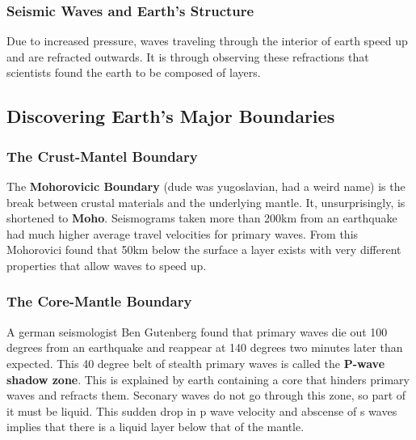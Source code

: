 \documentclass{article}
\begin{document}
\subsubsection{Seismic Waves and Earth's Structure} %
\label{ssub:seismic_waves_and_earth_s_structure}
Due to increased pressure, waves traveling through the interior of earth speed up and are refracted outwards. It is through observing these refractions that scientists found the earth to be composed of layers.

\subsection{Discovering Earth's Major Boundaries} %
\label{sub:discovering_earth_s_major_boundaries}
\subsubsection{The Crust-Mantel Boundary} %
\label{ssub:the_crust_mantel_boundary}
The \textbf{Mohorovicic Boundary} (dude was yugoslavian, had a weird name) is the break between crustal materials and the underlying mantle. It, unsurprisingly, is shortened to \textbf{Moho}. Seismograms taken more than 200km from an earthquake had much higher average travel velocities for primary waves. From this Mohorovici found that 50km below the surface a layer exists with very different properties that allow waves to speed up.
\subsubsection{The Core-Mantle Boundary} %
\label{ssub:the_core_mantle_boundary}
A german seismologist Ben Gutenberg found that primary waves die out 100 degrees from an earthquake and reappear at 140 degrees two minutes later than expected. This 40 degree belt of stealth primary waves is called the \textbf{P-wave shadow zone}. This is explained by earth containing a core that hinders primary waves and refracts them. Seconary waves do not go through this zone, so part of it must be liquid. This sudden drop in p wave velocity and abscense of s waves implies that there is a liquid layer below that of the mantle.
\end{document}
